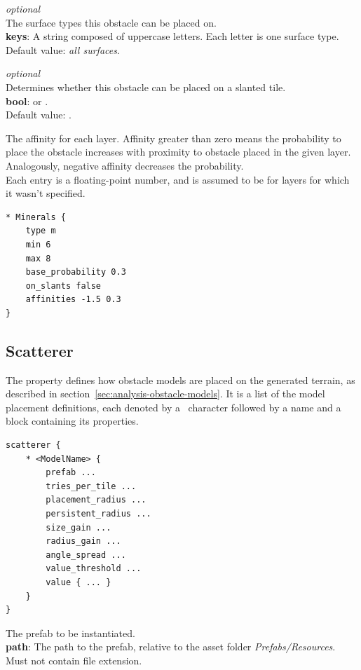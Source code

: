 \emph{optional}\\
The surface types this obstacle can be placed on.\\
\textbf{keys}: A string composed of uppercase letters. Each letter is one surface type.\\
Default value: \emph{all surfaces}.

\emph{optional}\\
Determines whether this obstacle can be placed on a slanted tile.\\
\textbf{bool}:  or .\\
Default value: .

The affinity for each layer.
Affinity greater than zero means the probability to place the obstacle increases with proximity to obstacle placed in the given layer.
Analogously, negative affinity decreases the probability.\\
Each entry is a floating-point number, and is assumed to be  for layers for which it wasn't specified.

\begin{verbatim}
* Minerals {
    type m
    min 6
    max 8
    base_probability 0.3
    on_slants false
    affinities -1.5 0.3
}
\end{verbatim}

\subsection{Scatterer}

The  property defines how obstacle models are placed on the generated terrain, as described in section~\ref{sec:analysis-obstacle-models}.
It is a list of the model placement definitions, each denoted by a \mono{*}~character followed by a name and a block containing its properties.

\begin{verbatim}
scatterer {
    * <ModelName> {
        prefab ...
        tries_per_tile ...
        placement_radius ...
        persistent_radius ...
        size_gain ...
        radius_gain ...
        angle_spread ...
        value_threshold ...
        value { ... }
    }
}
\end{verbatim}

The prefab to be instantiated.\\
\textbf{path}: The path to the prefab, relative to the asset folder \emph{Prefabs/Resources}. Must not contain file extension.


